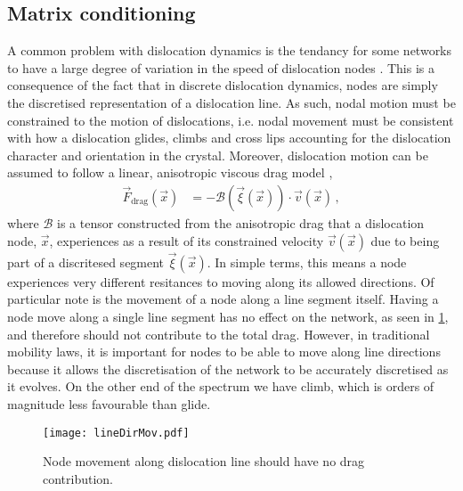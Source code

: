 \subsection{Matrix conditioning}
\label{ss:matrix}

A common problem with dislocation dynamics is the tendancy for some networks to have a large degree of variation in the speed of dislocation nodes \cite{bertin2019gpu,ddlab,arsenlis2007enabling}. This is a consequence of the fact that in discrete dislocation dynamics, nodes are simply the discretised representation of a dislocation line. As such, nodal motion must be constrained to the motion of dislocations, i.e. nodal movement must be consistent with how a dislocation glides, climbs and cross lips accounting for the dislocation character and orientation in the crystal. Moreover, dislocation motion can be assumed to follow a linear, anisotropic viscous drag model \cite{ddlab},
\begin{align}\label{eq:dragCoef}
    \vec{F}_\textrm{drag}(\vec{x}) & = -\mathcal{B}(\vec{\xi}(\vec{x})) \cdot \vec{v}(\vec{x})\,,
\end{align}
where $\mathcal{B}$ is a tensor constructed from the anisotropic drag that a dislocation node, $\vec{x}$, experiences as a result of its constrained velocity $\vec{v}(\vec{x})$ due to being part of a discritesed segment $\vec{\xi}(\vec{x})$. In simple terms, this means a node experiences very different resitances to moving along its allowed directions. Of particular note is the movement of a node along a line segment itself. Having a node move along a single line segment has no effect on the network, as seen in \cref{fig:lineMovement}, and therefore should not contribute to the total drag. However, in traditional mobility laws, it is important for nodes to be able to move along line directions because it allows the discretisation of the network to be accurately discretised as it evolves. On the other end of the spectrum we have climb, which is orders of magnitude less favourable than glide.
\begin{figure}\label{fig:lineMovement}
    \centering
    \texttt{[image: lineDirMov.pdf]}
    \caption{Node movement along dislocation line should have no drag contribution.}
\end{figure}

